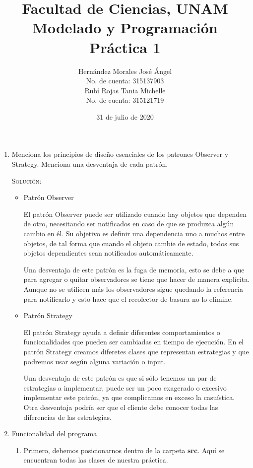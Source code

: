\documentclass[letterpaper,11pt]{article}
\title{Facultad de Ciencias, UNAM \\ Modelado y Programación \\ Práctica 1}
\author{Hernández Morales José Ángel \\ No. de cuenta: 315137903 \\ 
        Rubí Rojas Tania Michelle \\ No. de cuenta: 315121719}
\date{31 de julio de 2020}
\begin{document}
\maketitle

\begin{enumerate}
    \item Menciona los principios de diseño esenciales de los patrones Observer
    y Strategy. Menciona una desventaja de cada patrón. 

    \textsc{Solución:}
    \begin{itemize}
        \item Patrón Observer
        
        El patrón Observer puede ser utilizado cuando hay objetos que dependen 
        de otro, necesitando ser notificados en caso de que se produzca algún 
        cambio en él. Su objetivo es definir una dependencia uno a muchos entre
        objetos, de tal forma que cuando el objeto cambie de estado, todos sus 
        objetos dependientes sean notificados automáticamente.

        Una desventaja de este patrón es la fuga de memoria, esto se debe a que 
        para agregar o quitar observadores se tiene que hacer de manera explícita.
        Aunque no se utilicen más los observadores sigue quedando la referencia 
        para notificarlo y esto hace que el recolector de basura no lo elimine. 

        \item Patrón Strategy 

        El patrón Strategy ayuda a definir diferentes comportamientos o 
        funcionalidades que pueden ser cambiadas en tiempo de ejecución. En el 
        patrón Strategy creamos diferetes clases que representan estrategias y 
        que podremos usar según alguna variación o input.

        Una desventaja de este patrón es que si sólo tenemos un par de 
        estrategias a implementar, puede ser un poco exagerado o excesivo
        implementar este patrón, ya que complicamos en exceso la casuística. 
        Otra desventaja podría ser que el cliente debe conocer todas las
        diferencias de las estrategias. 
    \end{itemize}

    \item Funcionalidad del programa
    
    \begin{enumerate}
        \item Primero, debemos posicionarnos dentro de la carpeta \textbf{src}.
        Aquí se encuentran todas las clases de nuestra práctica.


\end{enumerate}
\end{enumerate}
\end{document}

